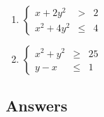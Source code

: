 \documentclass{ximera}
\begin{document}
\begin{multicols}{2}
\begin{enumerate}
\setcounter{enumi}{\value{HW}}

\item $\left\{\begin{array}{rcr}  x + 2y^{2} & > & 2 \\ x^{2} + 4y^{2} & \leq & 4  \end{array} \right.$
\item $\left\{\begin{array}{rcr}  x^{2} + y^{2} & \geq & 25 \\ y - x & \leq & 1  \end{array} \right.$ \label{nonlinearsysineqlast}

\setcounter{HW}{\value{enumi}}
\end{enumerate}
\end{multicols}


\newpage

\subsection{Answers}
\end{document}
